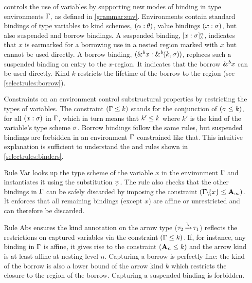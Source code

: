 \lang controls the use of variables by supporting new modes of
binding in type environments $\Gamma$, as defined in \cref{grammar:env}.
Environments contain standard bindings of type variables to kind schemes,
$(\alpha : \theta)$, value bindings $(x : \sigma)$, but also
suspended and borrow bindings.
A suspended binding, $[x : \sigma]_{\textit{b}}^n$, indicates that $x$ is
earmarked for a borrowing use in a nested region
marked with $x$ %
but
cannot be used directly.
A borrow binding, $({\&}^{\textit{b}}x : {\&}^{\textit{b}}(k,\sigma))$, replaces
such a suspended binding on entry to the $x$-region. It indicates
that the borrow ${\&}^{\textit{b}}x$ can be used directly. Kind $k$
restricts the lifetime of the borrow to the region (see \cref{selectrules:borrow}).


Constraints on an environment control substructural properties by
restricting the types of variables.  The constraint $(\Gamma \leq k)$
stands for the conjunction of $(\sigma \leq k)$, for all $(x : \sigma)$
in $\Gamma$, which in turn means that $k' \leq k$ where $k'$ is the kind of
the variable's type scheme $\sigma$.
Borrow bindings follow the same rules, but suspended bindings
are forbidden in an environment $\Gamma$ constrained like that.
This intuitive explanation is sufficient to understand
the  and  rules shown in
\cref{selectrules:binders}.

Rule {\sc Var} looks up the type scheme of the variable $x$ in
the environment $\Gamma$
and instantiates it using the substitution $\mathrm{\psi}$. The rule also
checks that the other bindings in $\Gamma$ can be safely discarded by
imposing the constraint $(\Gamma\!\!\mathbin{\setminus}\!\!\{x\} \leq \mathbf{A}_\infty)$.
It enforces that all remaining bindings (except $x$) are affine or
unrestricted and can therefore be discarded.

Rule {\sc Abs} ensures the kind annotation on the arrow type
($\tau_2 \operatorname{\xrightarrow{k}} \tau_1$) reflects the restrictions on captured variables
via the constraint $(\Gamma \leq k)$.
If, for instance, any binding in $\Gamma$ is affine, it gives rise to the
constraint $(\mathbf{A}_n \leq k)$ and the arrow kind is at least
affine at nesting level $n$.
Capturing a borrow is perfectly fine: the kind of the borrow is also a
lower bound of the arrow kind $k$ which restricts the closure
to the region of the borrow.
Capturing a suspended binding is forbidden.




